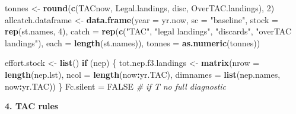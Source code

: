 \documentclass[
]{article}
\newenvironment{Shaded}{\begin{snugshade}}{\end{snugshade}}
\newcommand{\CommentTok}[1]{\textcolor[rgb]{0.56,0.35,0.01}{\textit{#1}}}
\newcommand{\ControlFlowTok}[1]{\textcolor[rgb]{0.13,0.29,0.53}{\textbf{#1}}}
\newcommand{\DataTypeTok}[1]{\textcolor[rgb]{0.13,0.29,0.53}{#1}}
\newcommand{\DecValTok}[1]{\textcolor[rgb]{0.00,0.00,0.81}{#1}}
\newcommand{\KeywordTok}[1]{\textcolor[rgb]{0.13,0.29,0.53}{\textbf{#1}}}
\newcommand{\NormalTok}[1]{#1}
\newcommand{\OperatorTok}[1]{\textcolor[rgb]{0.81,0.36,0.00}{\textbf{#1}}}
\newcommand{\OtherTok}[1]{\textcolor[rgb]{0.56,0.35,0.01}{#1}}
\newcommand{\StringTok}[1]{\textcolor[rgb]{0.31,0.60,0.02}{#1}}
\begin{document}
\begin{Shaded}
\begin{Highlighting}[]
\NormalTok{tonnes <-}\StringTok{ }\KeywordTok{round}\NormalTok{(}\KeywordTok{c}\NormalTok{(TACnow, Legal.landings, disc, OverTAC.landings), }\DecValTok{2}\NormalTok{)}
\NormalTok{allcatch.dataframe <-}\StringTok{ }\KeywordTok{data.frame}\NormalTok{(}\DataTypeTok{year =}\NormalTok{ yr.now, }\DataTypeTok{sc =} \StringTok{"baseline"}\NormalTok{, }\DataTypeTok{stock =} \KeywordTok{rep}\NormalTok{(st.names, }
    \DecValTok{4}\NormalTok{), }\DataTypeTok{catch =} \KeywordTok{rep}\NormalTok{(}\KeywordTok{c}\NormalTok{(}\StringTok{"TAC"}\NormalTok{, }\StringTok{"legal landings"}\NormalTok{, }\StringTok{"discards"}\NormalTok{, }\StringTok{"overTAC landings"}\NormalTok{), }\DataTypeTok{each =} \KeywordTok{length}\NormalTok{(st.names)), }
    \DataTypeTok{tonnes =} \KeywordTok{as.numeric}\NormalTok{(tonnes))}

\NormalTok{effort.stock <-}\StringTok{ }\KeywordTok{list}\NormalTok{()}
\ControlFlowTok{if}\NormalTok{ (nep) \{}
\NormalTok{    tot.nep.f3.landings <-}\StringTok{ }\KeywordTok{matrix}\NormalTok{(}\DataTypeTok{nrow =} \KeywordTok{length}\NormalTok{(nep.lst), }\DataTypeTok{ncol =} \KeywordTok{length}\NormalTok{(now}\OperatorTok{:}\NormalTok{yr.TAC), }
        \DataTypeTok{dimnames =} \KeywordTok{list}\NormalTok{(nep.names, now}\OperatorTok{:}\NormalTok{yr.TAC))}
\NormalTok{\}}
\NormalTok{Fc.silent =}\StringTok{ }\OtherTok{FALSE}  \CommentTok{# if T no full diagnostic}
\end{Highlighting}
\end{Shaded}

\textbf{4. TAC rules}
\end{document}
